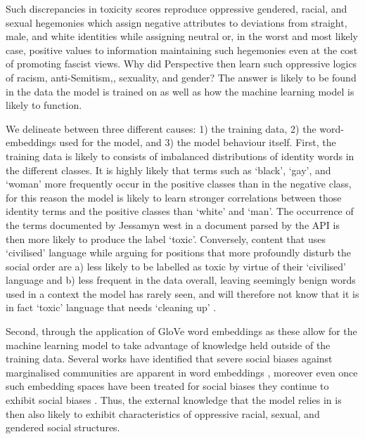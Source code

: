 Such discrepancies in toxicity scores reproduce oppressive gendered, racial, and sexual hegemonies which assign negative attributes to deviations from straight, male, and white identities while assigning neutral or, in the worst and most likely case, positive values to information maintaining such hegemonies even at the cost of promoting fascist views. Why did Perspective then learn such oppressive logics of racism, anti-Semitism,, sexuality, and gender? The answer is likely to be found in the data the model is trained on as well as how the machine learning model is likely to function.\vspace{5mm}

We delineate between three different causes: 1) the training data, 2) the word-embeddings used for the model, and 3) the model behaviour itself. First, the training data is likely to consists of imbalanced distributions of identity words in the different classes. It is highly likely that terms such as `black', `gay', and `woman' more frequently occur in the positive classes than in the negative class, for this reason the model is likely to learn stronger correlations between those identity terms and the positive classes than `white' and `man'. The occurrence of the terms documented by Jessamyn west in a document parsed by the API is then more likely to produce the label `toxic'. Conversely, content that uses `civilised' language while arguing for positions that more profoundly disturb the social order are a) less likely to be labelled as toxic by virtue of their `civilised' language and b) less frequent in the data overall, leaving seemingly benign words used in a context the model has rarely seen, and will therefore not know that it is in fact `toxic' language that needs `cleaning up' \cite{Gomes:2018}.

Second, through the application of GloVe word embeddings \cite{Pennington:2014} as these allow for the machine learning model to take advantage of knowledge held outside of the training data. Several works have identified that severe social biases against marginalised communities are apparent in word embeddings \cite{Speer:2017,Bolukbasi:2016,Nissim:2019,Zhao:2017,Zhao:2020}, moreover even once such embedding spaces have been treated for social biases they continue to exhibit social biases \cite{Gonen:2019}. Thus, the external knowledge that the model relies in is then also likely to exhibit characteristics of oppressive racial, sexual, and gendered social structures.

